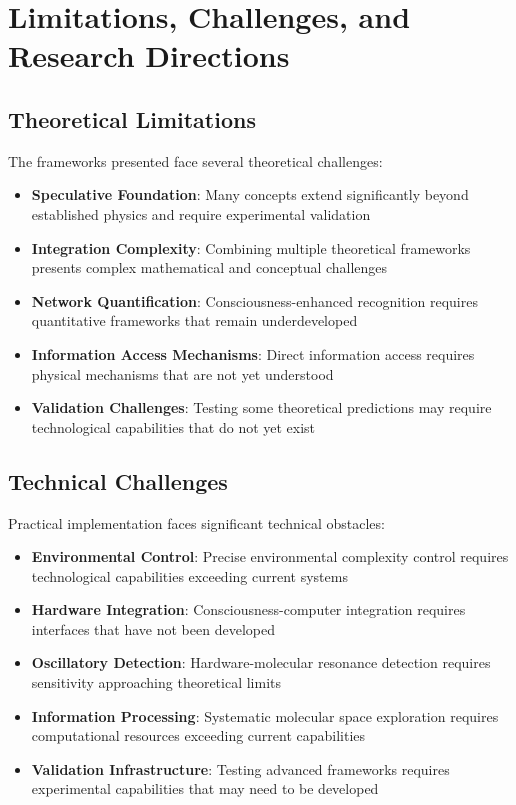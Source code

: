 \documentclass[11pt,a4paper]{article}
\theoremstyle{remark}
\begin{document}
\section{Limitations, Challenges, and Research Directions}

\subsection{Theoretical Limitations}

The frameworks presented face several theoretical challenges:

\begin{itemize}
\item \textbf{Speculative Foundation}: Many concepts extend significantly beyond established physics and require experimental validation
\item \textbf{Integration Complexity}: Combining multiple theoretical frameworks presents complex mathematical and conceptual challenges
\item \textbf{Network Quantification}: Consciousness-enhanced recognition requires quantitative frameworks that remain underdeveloped
\item \textbf{Information Access Mechanisms}: Direct information access requires physical mechanisms that are not yet understood
\item \textbf{Validation Challenges}: Testing some theoretical predictions may require technological capabilities that do not yet exist
\end{itemize}

\subsection{Technical Challenges}

Practical implementation faces significant technical obstacles:

\begin{itemize}
\item \textbf{Environmental Control}: Precise environmental complexity control requires technological capabilities exceeding current systems
\item \textbf{Hardware Integration}: Consciousness-computer integration requires interfaces that have not been developed
\item \textbf{Oscillatory Detection}: Hardware-molecular resonance detection requires sensitivity approaching theoretical limits
\item \textbf{Information Processing}: Systematic molecular space exploration requires computational resources exceeding current capabilities
\item \textbf{Validation Infrastructure}: Testing advanced frameworks requires experimental capabilities that may need to be developed
\end{itemize}
\end{document}

